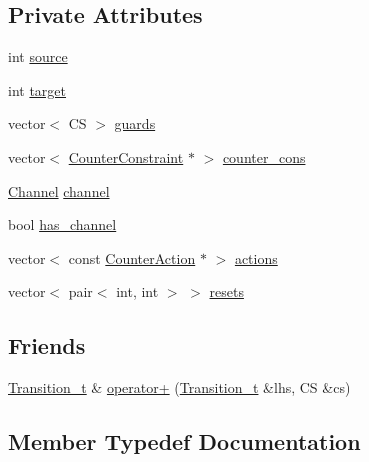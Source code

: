\subsection*{Private Attributes}
\begin{DoxyCompactItemize}
\item 
int \mbox{\hyperlink{classgraphsat_1_1_transition_a968bd64e847732f78a159a18630f9c8e}{source}}
\item 
int \mbox{\hyperlink{classgraphsat_1_1_transition_afbd4e7681da539737620c99ae44cb62e}{target}}
\item 
vector$<$ CS $>$ \mbox{\hyperlink{classgraphsat_1_1_transition_a09145e27f96327f8e520d89493491371}{guards}}
\item 
vector$<$ \mbox{\hyperlink{classgraphsat_1_1_counter_constraint}{Counter\+Constraint}} $\ast$ $>$ \mbox{\hyperlink{classgraphsat_1_1_transition_a69466bc4b2339eac009773adcdf4870a}{counter\+\_\+cons}}
\item 
\mbox{\hyperlink{structgraphsat_1_1_channel}{Channel}} \mbox{\hyperlink{classgraphsat_1_1_transition_a35ba5cebf6ca15cd1be02930de7907a5}{channel}}
\item 
bool \mbox{\hyperlink{classgraphsat_1_1_transition_adaa42c53ad073c5a9e02dc40d91f43eb}{has\+\_\+channel}}
\item 
vector$<$ const \mbox{\hyperlink{classgraphsat_1_1_counter_action}{Counter\+Action}} $\ast$ $>$ \mbox{\hyperlink{classgraphsat_1_1_transition_af85c7164e1f45a5cf6bcd87d7d17e4cf}{actions}}
\item 
vector$<$ pair$<$ int, int $>$ $>$ \mbox{\hyperlink{classgraphsat_1_1_transition_ae6b0cebbcee753c3c730e7ead03200cd}{resets}}
\end{DoxyCompactItemize}
\subsection*{Friends}
\begin{DoxyCompactItemize}
\item 
\mbox{\hyperlink{classgraphsat_1_1_transition_ae0650c39cf272493d16d1fd1b01b6075}{Transition\+\_\+t}} \& \mbox{\hyperlink{classgraphsat_1_1_transition_ab2da70aa54b7aab66ef0294fd1a0d519}{operator+}} (\mbox{\hyperlink{classgraphsat_1_1_transition_ae0650c39cf272493d16d1fd1b01b6075}{Transition\+\_\+t}} \&lhs, CS \&cs)
\end{DoxyCompactItemize}


\subsection{Member Typedef Documentation}
\mbox{\label{classgraphsat_1_1_transition_ae0650c39cf272493d16d1fd1b01b6075}} 
